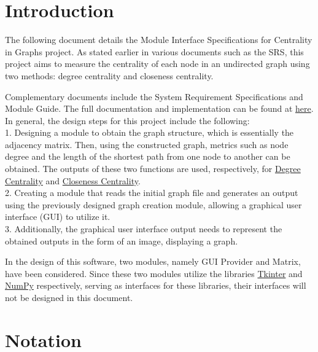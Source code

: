 \documentclass[12pt, titlepage]{article}
\begin{document}
\section{Introduction}

The following document details the Module Interface Specifications for Centrality in Graphs project. As stated earlier in various documents such as the SRS, this project aims to measure the centrality of each node in an undirected graph using two methods: degree centrality and closeness centrality.

Complementary documents include the System Requirement Specifications
and Module Guide.  The full documentation and implementation can be
found at \href{https://github.com/AtiyehSayadi/Centrality-In-Graphs/blob/main/docs/ProblemStatementAndGoals/ProblemStatement.pdf}{here}. \\
In general, the design steps for this project include the following:\\
1. Designing a module to obtain the graph structure, which is essentially the adjacency matrix. Then, using the constructed graph, metrics such as node degree and the length of the shortest path from one node to another can be obtained. The outputs of these two functions are used, respectively, for \href{https://towardsdatascience.com/graph-analytics-introduction-and-concepts-of-centrality-8f5543b55de3}{Degree Centrality} and \href{https://www.geeksforgeeks.org/closeness-centrality-centrality-measure/}{Closeness Centrality}.\\
2. Creating a module that reads the initial graph file and generates an output using the previously designed graph creation module, allowing a graphical user interface (GUI) to utilize it.\\
3. Additionally, the graphical user interface output needs to represent the obtained outputs in the form of an image, displaying a graph.

In the design of this software, two modules, namely GUI Provider and Matrix, have been considered. Since these two modules utilize the libraries \href{https://docs.python.org/3/library/tk.html}{Tkinter} and \href{https://numpy.org/}{NumPy} respectively, serving as interfaces for these libraries, their interfaces will not be designed in this document.

\section{Notation}
\end{document}
